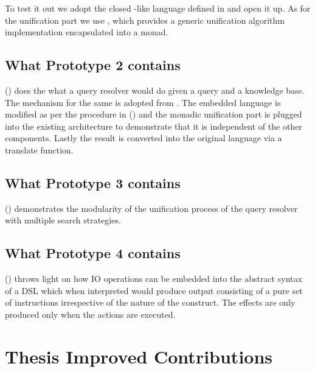\documentclass[thesis-solanki.tex]{subfiles}
\begin{document}
  To test it out we adopt the closed -like language defined in \cite{prolog-lib} and open it up.
  As for the unification part we use \cite{unification-fd-lib}, which provides a generic unification algorithm
  implementation encapsulated into a monad.


\subsection{What Prototype 2 contains}

  () does the what a  query resolver would do given a
  query and a knowledge base.
  The mechanism for the same is adopted from \cite{prolog-lib}.
  The embedded language is modified as per the procedure in () and the
  monadic unification part is plugged into the existing architecture to demonstrate that it is independent of the
  other components.
  Lastly the result is converted into the original language via a translate function.

\subsection{What Prototype 3 contains}

  () demonstrates the modularity of the unification process of the query
  resolver with multiple search strategies.

\subsection{What Prototype 4 contains}

  () throws light on how IO operations can be embedded into the abstract
  syntax of a DSL which when interpreted would produce output consisting of a pure set of instructions irrespective
  of the nature of the construct.
  The effects are only produced only when the actions are executed.


\section{Thesis Improved Contributions}\label{sec:thes-impr-contr}
\end{document}
